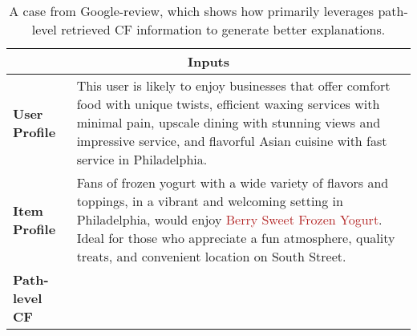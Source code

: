 \begin{table*}[t]
    \centering
    \caption{A case from Google-review, which shows how \model primarily leverages path-level retrieved CF information to generate better explanations.}
    \small
    \begin{tabular}{p{}p{}}
        \toprule
        \multicolumn{2}{c}{\textbf{Inputs}} \\ \midrule
        \textbf{User Profile} &  This user is likely to enjoy businesses that offer comfort food with unique twists, efficient waxing services with minimal pain, upscale dining with stunning views and impressive service, and flavorful Asian cuisine with fast service in Philadelphia. \\
        \midrule
        \textbf{Item Profile} &
        Fans of frozen yogurt with a wide variety of flavors and toppings, in a vibrant and welcoming setting in Philadelphia, would enjoy \textcolor[HTML]{B22222}{Berry Sweet Frozen Yogurt}. Ideal for those who appreciate a fun atmosphere, quality treats, and convenient location on South Street. \\
        \midrule
        \textbf{Path-level CF} & 

\end{tabular}
\end{table*}
